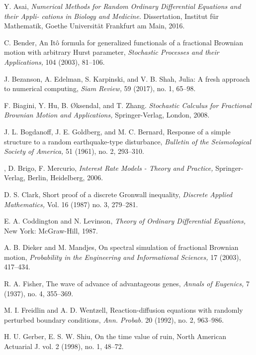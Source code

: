 \documentclass[reqno,12pt]{amsart}
\theoremstyle{plain} %
\theoremstyle{definition} %
\begin{document}
\begin{thebibliography}{25}
     Y. Asai, \emph{Numerical Methods for Random Ordinary Differential Equations and their Appli-
    cations in Biology and Medicine.} Dissertation, Institut f\"ur Mathematik, Goethe Universit\"at Frankfurt am Main, 2016. 

     C. Bender, An It\^o formula for generalized functionals of a fractional Brownian motion with arbitrary Hurst parameter, \emph{Stochastic Processes and their Applications,} 104 (2003), 81--106.

     J. Bezanson, A. Edelman, S. Karpinski, and V. B. Shah, Julia: A fresh approach to numerical computing, \emph{Siam Review,} 59 (2017), no. 1, 65--98.

     F. Biagini, Y. Hu, B. {\O}ksendal, and T. Zhang. \emph{Stochastic Calculus for Fractional Brownian Motion and Applications,} Springer-Verlag, London, 2008.

     J. L. Bogdanoff, J. E. Goldberg, and M. C. Bernard, Response of a simple structure to a random earthquake-type disturbance, \emph{Bulletin of the Seismological Society of America,} 51 (1961), no. 2, 293--310.

    , D. Brigo, F. Mercurio, \emph{Interest Rate Models - Theory and Practice,} Springer-Verlag, Berlin, Heidelberg, 2006.

     D. S. Clark, Short proof of a discrete Gronwall inequality, \emph{Discrete Applied Mathematics,} Vol. 16 (1987) no. 3, 279--281.

     E. A. Coddington and N. Levinson, \emph{Theory of Ordinary Differential Equations,} New York: McGraw-Hill, 1987.

     A. B. Dieker and M. Mandjes, On spectral simulation of fractional Brownian motion, \emph{Probability in the Engineering and Informational Sciences,} 17 (2003), 417--434.

     R. A. Fisher, The wave of advance of advantageous genes, \emph{Annals of Eugenics,} 7 (1937), no. 4, 355--369.

     M. I. Freidlin and A. D. Wentzell, Reaction-diffusion equations with randomly perturbed boundary conditions, \emph{Ann. Probab.} 20 (1992), no. 2, 963--986.

     H. U. Gerber, E. S. W. Shiu, On the time value of ruin, North American Actuarial J. 
    vol. 2 (1998), no. 1, 48--72.


\end{thebibliography}
\end{document}
